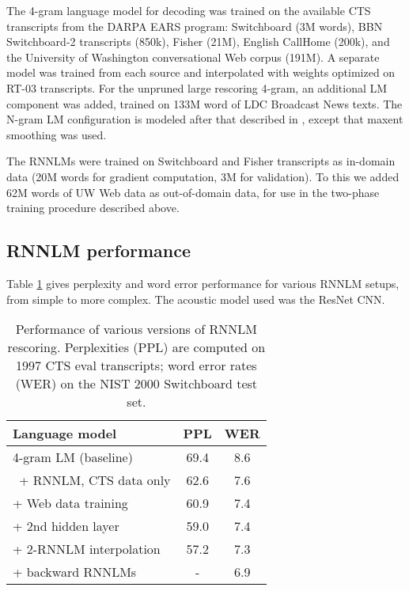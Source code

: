 \documentclass{article}
\begin{document}
The 4-gram language model for decoding was trained on the available CTS transcripts from the 
DARPA EARS program: Switchboard (3M words), BBN Switchboard-2 transcripts (850k), Fisher (21M), 
English CallHome (200k), and the University of Washington conversational Web corpus (191M).
A separate model was trained from each source and interpolated with weights optimized on RT-03 transcripts.
For the unpruned large rescoring 4-gram, an additional LM component was added, trained on 133M word of LDC
Broadcast News texts.  The N-gram LM configuration is modeled after that described in \cite{saonSRK16}, except that
maxent smoothing was used.

The RNNLMs were trained on Switchboard and Fisher transcripts as in-domain data (20M words for gradient computation,
3M for validation).
To this we added 62M words of UW Web data as out-of-domain data,
for use in the two-phase training procedure described above.  

\subsection{RNNLM performance}

Table \ref{tab:rnnlm-results} gives perplexity and word error performance for various RNNLM setups,
from simple to more complex.  The acoustic model used was the ResNet CNN.

\begin{table}
    \centering
    \caption{Performance of various versions of RNNLM rescoring.
		Perplexities (PPL) are computed on 1997 CTS eval transcripts;
		word error rates (WER) on the NIST 2000 Switchboard test set.}
\vspace*{0.1in}
	\label{tab:rnnlm-results}
    \begin{tabular}{|l|c|c|}
    \hline
	Language model					&  PPL	& WER \\
     \hline
	4-gram LM (baseline)				& 69.4	& 8.6 \\
	\  + RNNLM, CTS data only			& 62.6	& 7.6 \\
	 \quad + Web data training			& 60.9	& 7.4 \\
	 \quad \quad + 2nd hidden layer			& 59.0	& 7.4 \\
	 \quad \quad \quad + 2-RNNLM interpolation	& 57.2	& 7.3 \\
	 \quad \quad \quad \quad + backward RNNLMs	& - 	& 6.9 \\
	\hline
    \end{tabular}
\vspace*{-0.1in}
\end{table}
\end{document}
